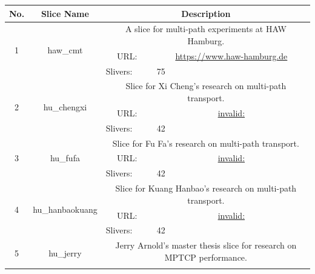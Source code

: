 \begin{small}
\begin{center}
\begin{longtable}{|c|c|c|c|}
 \hline
 No. & Slice Name & \multicolumn{2}{|p{20em}|}{Description} \\ \hline
 \multirow{3}{*}{1} & \multirow{3}{*}{\index{haw\_cmt}\index{Slice!haw\_cmt}haw\_cmt} & \multicolumn{2}{|p{30em}|}{A slice for multi-path experiments at HAW Hamburg.} \\* \cline{3-3}\cline{4-4}
  &  & \multicolumn{1}{|p{5em}|}{URL:} & \multicolumn{1}{|p{22.5em}|}{\url{https://www.haw-hamburg.de}} \\* \cline{3-3}\cline{4-4}
  &  & \multicolumn{1}{|l|}{Slivers:} & \multicolumn{1}{|l|}{75} \\ \hline
 \multirow{3}{*}{2} & \multirow{3}{*}{\index{hu\_chengxi}\index{Slice!hu\_chengxi}hu\_chengxi} & \multicolumn{2}{|p{30em}|}{Slice for Xi Cheng's research on multi-path transport.} \\* \cline{3-3}\cline{4-4}
  &  & \multicolumn{1}{|p{5em}|}{URL:} & \multicolumn{1}{|p{22.5em}|}{\url{invalid:}} \\* \cline{3-3}\cline{4-4}
  &  & \multicolumn{1}{|l|}{Slivers:} & \multicolumn{1}{|l|}{42} \\ \hline
 \multirow{3}{*}{3} & \multirow{3}{*}{\index{hu\_fufa}\index{Slice!hu\_fufa}hu\_fufa} & \multicolumn{2}{|p{30em}|}{Slice for Fu Fa's research on multi-path transport.} \\* \cline{3-3}\cline{4-4}
  &  & \multicolumn{1}{|p{5em}|}{URL:} & \multicolumn{1}{|p{22.5em}|}{\url{invalid:}} \\* \cline{3-3}\cline{4-4}
  &  & \multicolumn{1}{|l|}{Slivers:} & \multicolumn{1}{|l|}{42} \\ \hline
 \multirow{3}{*}{4} & \multirow{3}{*}{\index{hu\_hanbaokuang}\index{Slice!hu\_hanbaokuang}hu\_hanbaokuang} & \multicolumn{2}{|p{30em}|}{Slice for Kuang Hanbao's research on multi-path transport.} \\* \cline{3-3}\cline{4-4}
  &  & \multicolumn{1}{|p{5em}|}{URL:} & \multicolumn{1}{|p{22.5em}|}{\url{invalid:}} \\* \cline{3-3}\cline{4-4}
  &  & \multicolumn{1}{|l|}{Slivers:} & \multicolumn{1}{|l|}{42} \\ \hline
 \multirow{3}{*}{5} & \multirow{3}{*}{\index{hu\_jerry}\index{Slice!hu\_jerry}hu\_jerry} & \multicolumn{2}{|p{30em}|}{Jerry Arnold's master thesis slice for research on MPTCP performance.} \\* \cline{3-3}\cline{4-4}

\end{longtable}
\end{center}
\end{small}
